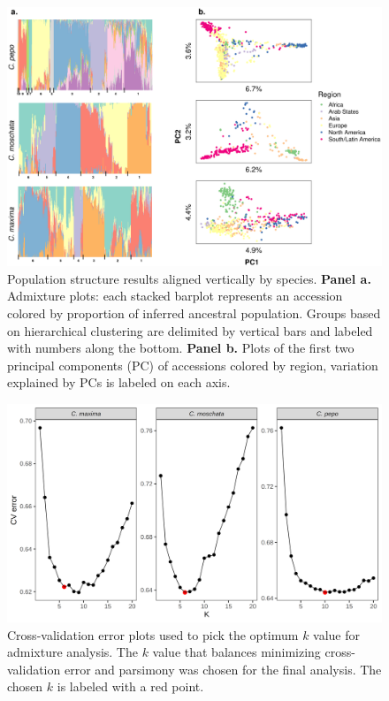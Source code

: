 \documentclass[utf8]{FrontiersinHarvard} %
\begin{document}
\clearpage

\begin{figure}[h]
	\begin{center}
		\includegraphics[width=\textwidth]{../final_figures/03_fig.png}
	\end{center}
	\caption{Population structure results aligned vertically by species. \textbf{Panel a.} Admixture plots: each stacked barplot represents an accession colored by proportion of inferred ancestral population. Groups based on hierarchical clustering are delimited by vertical bars and labeled with numbers along the bottom. \textbf{Panel b.} Plots of the first two principal components (PC) of accessions colored by region, variation explained by PCs is labeled on each axis. \label{fig:3}}
\end{figure}

\clearpage

\begin{figure}[h]
	\begin{center}
		\includegraphics[width=\textwidth]{../final_figures/04_fig.png}
	\end{center}
	\caption{Cross-validation error plots used to pick the optimum $k$ value for admixture analysis. The $k$ value that balances minimizing cross-validation error and parsimony was chosen for the final analysis. The chosen $k$ is labeled with a red point. \label{fig:4}}
\end{figure}
\end{document}
